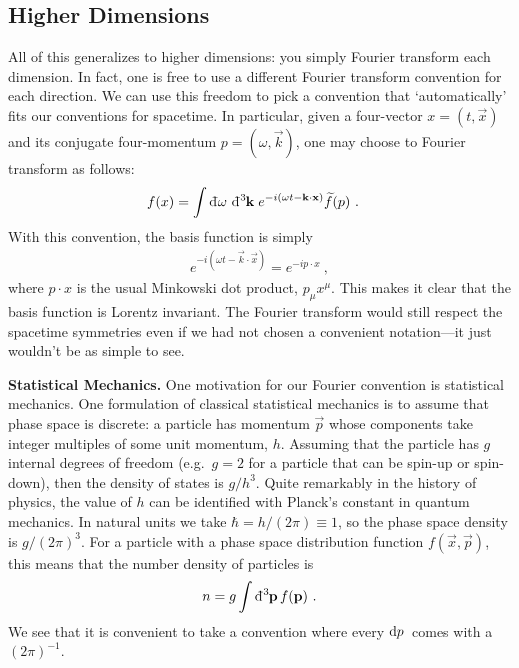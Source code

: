 \begin{subappendices}
\section{Higher Dimensions}

All of this generalizes to higher dimensions: you simply Fourier transform each dimension. In fact, one is free to use a different Fourier transform convention for each direction. We can use this freedom to pick a convention that `automatically' fits our conventions for spacetime. In particular, given a four-vector $x=(t,\vec{x})$ and its conjugate four-momentum $p=(\omega, \vec{k})$, one may choose to Fourier transform as follows: 
\begin{align}
  f(x) &= \int \Dbar\omega \DDbar{3}{\vec{k}}\; 
  e^{-i(\omega t-\vec{k}\cdot\vec{x})} \tilde f(p)
  \ .
\end{align}
With this convention, the basis function is simply
\begin{align}
  e^{-i(\omega t-\vec{k}\cdot\vec{x})} 
  = e^{-ip\cdot x} \ , 
\end{align}
where $p\cdot x$ is the usual Minkowski dot product, $p_\mu x^\mu$. This makes it clear that the basis function is Lorentz invariant. The Fourier transform would still respect the spacetime symmetries even if we had not chosen a convenient notation---it just wouldn't be as simple to see.



\begin{example}
\textbf{Statistical Mechanics.} One motivation for our Fourier convention is statistical mechanics. One formulation of classical statistical mechanics is to assume that phase space is discrete: a particle has momentum $\vec{p}$ whose components take integer multiples of some unit momentum, $h$. Assuming that the particle has $g$ internal degrees of freedom (e.g.~$g=2$ for a particle that can be spin-up or spin-down), then the density of states is $g/h^{3}$. Quite remarkably in the history of physics, the value of $h$ can be identified with Planck's constant in quantum mechanics. In natural units we take $\hbar = h/(2\pi)\equiv 1$, so the phase space density is $g/(2\pi)^3$. For a particle with a phase space distribution function $f(\vec{x},\vec{p})$, this means that the number density of particles is
\begin{align}
  n = g\int \DDbar{3}{\vec{p}} \, f(\vec{p}) \ .
\end{align}
We see that it is convenient to take a convention where every $\operatorname{d}\mkern-3mu^{}\mkern-1mu{p}\,$ comes with a $(2\pi)^{-1}$.
\end{example}


\end{subappendices}
